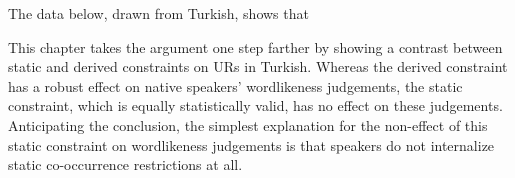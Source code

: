 The data below, drawn from Turkish, shows that 



This chapter takes the argument one step farther by showing a contrast between static and derived constraints on URs in Turkish. Whereas the derived constraint has a robust effect on native speakers' wordlikeness judgements, the static constraint, which is equally statistically valid, has no effect on these judgements. Anticipating the conclusion, the simplest explanation for the non-effect of this static constraint on wordlikeness judgements is that speakers do not internalize static co-occurrence restrictions at all. 






